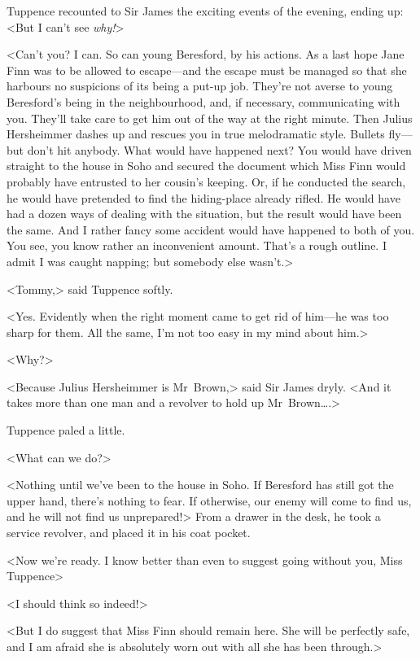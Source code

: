 Tuppence recounted to Sir James the exciting events of the evening, ending up: <But I can't see \emph{why!}>

<Can't you? I can. So can young Beresford, by his actions. As a last hope Jane Finn was to be allowed to escape—and the escape must be managed so that she harbours no suspicions of its being a put-up job. They're not averse to young Beresford's being in the neighbourhood, and, if necessary, communicating with you. They'll take care to get him out of the way at the right minute. Then Julius Hersheimmer dashes up and rescues you in true melodramatic style. Bullets fly—but don't hit anybody. What would have happened next? You would have driven straight to the house in Soho and secured the document which Miss Finn would probably have entrusted to her cousin's keeping. Or, if he conducted the search, he would have pretended to find the hiding-place already rifled. He would have had a dozen ways of dealing with the situation, but the result would have been the same. And I rather fancy some accident would have happened to both of you. You see, you know rather an inconvenient amount. That's a rough outline. I admit I was caught napping; but somebody else wasn't.>

<Tommy,> said Tuppence softly.

<Yes. Evidently when the right moment came to get rid of him—he was too sharp for them. All the same, I'm not too easy in my mind about him.>

<Why?>

<Because Julius Hersheimmer is Mr~Brown,> said Sir James dryly. <And it takes more than one man and a revolver to hold up Mr~Brown\dots.>

Tuppence paled a little.

<What can we do?>

<Nothing until we've been to the house in Soho. If Beresford has still got the upper hand, there's nothing to fear. If otherwise, our enemy will come to find us, and he will not find us unprepared!> From a drawer in the desk, he took a service revolver, and placed it in his coat pocket.

<Now we're ready. I know better than even to suggest going without you, Miss Tuppence\longdash>

<I should think so indeed!>

<But I do suggest that Miss Finn should remain here. She will be perfectly safe, and I am afraid she is absolutely worn out with all she has been through.>

